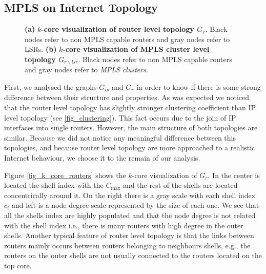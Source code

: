 \subsection{MPLS on Internet Topology}\label{cluster.topo}
\begin{figure*}[!t]
\centering
{}
\hfil
{}
\caption{ \textbf{(a)} \textbf{$k$-core visualization of router level topology $G_{r}$.} Black nodes refer to non MPLS capable routers and gray nodes refer to LSRs. \textbf{(b)} \textbf{$k$-core visualization of MPLS cluster level topology  $G_{r\backslash lsr}$}. Black nodes refer to non MPLS capable routers and gray nodes refer to \textit{MPLS clusters}.}
\label{fig_kcore_overview}
\end{figure*}

First, we analysed the graphs $G_{ip}$ and $G_{r}$ in order to know if there is
some strong difference between their structure and properties. As was expected
we noticed that the router level topology has slightly stronger clustering coefficient than
IP level topology (see \ref{fig_clustering}). This fact occurs due to the join of IP interfaces into single
routers. However, the main structure of both topologies are similar. Because we did not
notice any meaningful difference between this topologies, and because router level topology
are more approached to a realistic Internet behaviour, we choose it to the remain of our analysis.

Figure \ref{fig_k_core_routers} shows the $k$-core visualization of $G_{r}$. In
the center is located the shell index with the $C_{\max}$  and the rest of
the shells are located concentrically around it. On the right there is a gray scale
with each shell index $c_i$ and left is a node degree scale represented by the
size of each one. We see that all the shells index are highly populated and that
the node degree is not related with the shell index i.e., there is many routers
with high degree in the outer shells. Another typical feature of router level topology is that the links between routers mainly occurs between routers belonging to neighbours shells, e.g., the routers on the outer shells are not usually connected to the routers located on the top core. 


